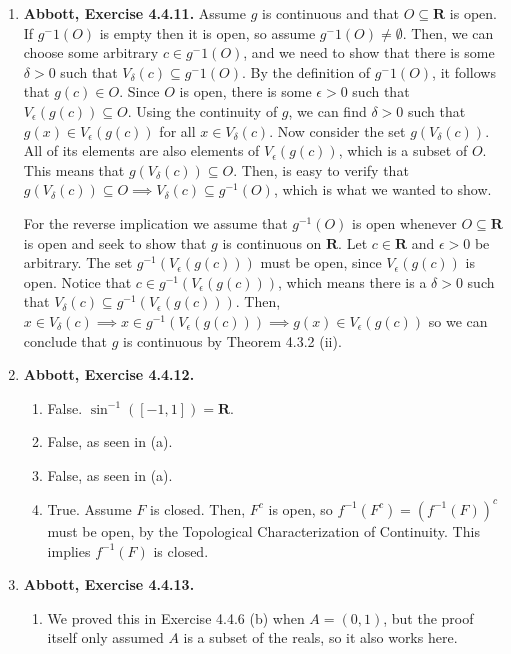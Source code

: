 \documentclass{article}
\newcommand{\R}{\mathbf{R}}
\newcommand{\exc}[2][Abbott]{\item \textbf{#1, Exercise #2.}}
\let\oldsin\sin
\renewcommand{\sin}[1]{\oldsin \left( #1 \right)}
\begin{document}
\begin{enumerate}
    \exc{4.4.11}
    Assume $g$ is continuous and that $O \subseteq \R$ is open. If $g^-1(O)$ is empty then it is open, so assume $g^-1(O) \neq \emptyset$. Then, we can choose some arbitrary $c \in g^-1(O)$, and we need to show that there is some $\delta > 0$ such that $V_{\delta}(c) \subseteq g^{-}1(O)$. By the definition of $g^-1(O)$, it follows that $g(c) \in O$. Since $O$ is open, there is some $\epsilon > 0$ such that $V_\epsilon(g(c)) \subseteq O$. Using the continuity of $g$, we can find $\delta > 0$ such that $g(x) \in V_\epsilon(g(c))$ for all $x \in V_\delta(c)$. Now consider the set $g(V_\delta(c))$. All of its elements are also elements of $V_\epsilon(g(c))$, which is a subset of $O$. This means that $g(V_\delta(c)) \subseteq O$. Then, is easy to verify that $g(V_\delta(c)) \subseteq O \implies V_\delta(c) \subseteq g^{-1}(O)$, which is what we wanted to show.
    
    For the reverse implication we assume that $g^{-1}(O)$ is open whenever $O \subseteq \R$ is open and seek to show that $g$ is continuous on $\R$. Let $c \in \R$ and $\epsilon > 0$ be arbitrary. The set $g^{-1}(V_\epsilon(g(c)))$ must be open, since $V_\epsilon(g(c))$ is open. Notice that $c \in g^{-1}(V_\epsilon(g(c)))$, which means there is a $\delta > 0$ such that $V_\delta(c) \subseteq g^{-1}(V_\epsilon(g(c)))$. Then, $x \in V_\delta(c) \implies x \in g^{-1}(V_\epsilon(g(c))) \implies g(x) \in V_\epsilon(g(c))$ so we can conclude that $g$ is continuous by Theorem 4.3.2 (ii).
    
    \exc{4.4.12}
    \begin{enumerate}
        \item False. $\oldsin^{-1}([-1,1]) = \R$.
        
        \item False, as seen in (a).
        
        \item False, as seen in (a). 
        
        \item True. Assume $F$ is closed. Then, $F^c$ is open, so $f^{-1}(F^c)=(f^{-1}(F))^c$ must be open, by the Topological Characterization of Continuity. This implies $f^{-1}(F)$ is closed.
    \end{enumerate}
    
    \exc{4.4.13}
    \begin{enumerate}
        \item We proved this in Exercise 4.4.6 (b) when $A = (0, 1)$, but the proof itself only assumed $A$ is a subset of the reals, so it also works here.
        

\end{enumerate}
\end{enumerate}
\end{document}
